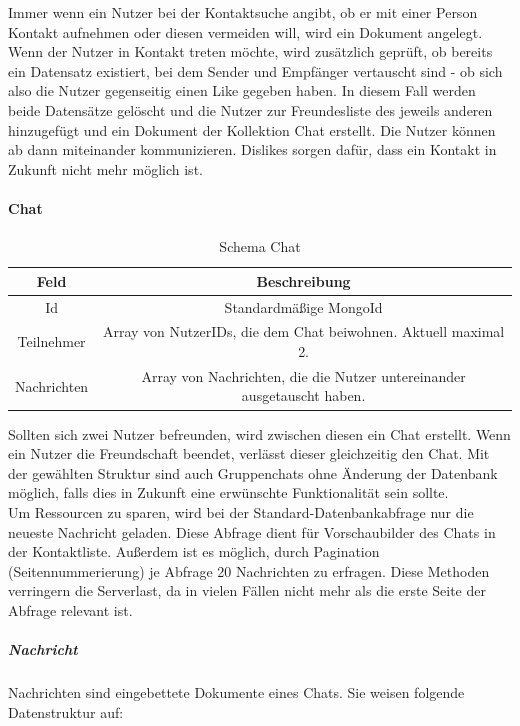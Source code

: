 Immer wenn ein Nutzer bei der Kontaktsuche angibt, ob er mit einer Person Kontakt aufnehmen oder diesen vermeiden will, wird ein Dokument angelegt. 
Wenn der Nutzer in Kontakt treten möchte, wird zusätzlich geprüft, ob bereits ein Datensatz existiert, bei dem Sender und Empfänger vertauscht sind - ob sich also die Nutzer gegenseitig einen Like gegeben haben. 
In diesem Fall werden beide Datensätze gelöscht und die Nutzer zur Freundesliste des jeweils anderen hinzugefügt und ein Dokument der Kollektion Chat erstellt. 
Die Nutzer können ab dann miteinander kommunizieren. 
Dislikes sorgen dafür, dass ein Kontakt in Zukunft nicht mehr möglich ist.

\paragraph{Chat\\}
\begin{table}
    \centering
    \begin{tabular}{ |c|c| }
        \hline
        Feld & Beschreibung  \\
        \hline
        Id & Standardmäßige MongoId \\
        Teilnehmer & Array von NutzerIDs, die dem Chat beiwohnen. Aktuell maximal 2. \\
        Nachrichten & Array von Nachrichten, die die Nutzer untereinander ausgetauscht haben. \\
        \hline
    \end{tabular}    
    \caption{Schema Chat}
    \label{db:table:chat}
\end{table}

Sollten sich zwei Nutzer befreunden, wird zwischen diesen ein Chat erstellt.
Wenn ein Nutzer die Freundschaft beendet, verlässt dieser gleichzeitig den Chat. 
Mit der gewählten Struktur sind auch Gruppenchats ohne Änderung der Datenbank möglich, falls dies in Zukunft eine erwünschte Funktionalität sein sollte.\\
Um Ressourcen zu sparen, wird bei der Standard-Datenbankabfrage nur die neueste Nachricht geladen.
Diese Abfrage dient für Vorschaubilder des Chats in der Kontaktliste.
Außerdem ist es möglich, durch Pagination (Seitennummerierung) je Abfrage 20 Nachrichten zu erfragen.
Diese Methoden verringern die Serverlast, da in vielen Fällen nicht mehr als die erste Seite der Abfrage relevant ist.\\

\subparagraph{Nachricht\\}
Nachrichten sind eingebettete Dokumente eines Chats.
Sie weisen folgende Datenstruktur auf:

